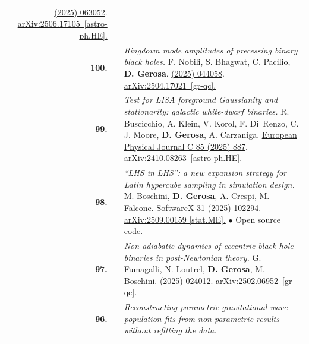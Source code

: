 {\begin{longtable}{rp{0.3cm}p{15.8cm}}
\newline{}
\href{https://journals.aps.org/prd/abstract/10.1103/jj7m-x66y}{\prd 112 (2025) 063052}. \href{https://arxiv.org/abs/2506.17105}{arXiv:2506.17105 [astro-ph.HE].}
\vspace{0.09cm}\\
%
\textbf{100.} & & \textit{Ringdown mode amplitudes of precessing binary black holes.}
\newline{}
F. Nobili, S. Bhagwat, C. Pacilio, \textbf{D. Gerosa}.
\newline{}
\href{https://journals.aps.org/prd/abstract/10.1103/cl3k-3xt2}{\prd 112 (2025) 044058}. \href{https://arxiv.org/abs/2504.17021}{arXiv:2504.17021 [gr-qc].}
\vspace{0.09cm}\\
%
\textbf{99.} & & \textit{Test for LISA foreground Gaussianity and stationarity: galactic white-dwarf binaries.}
\newline{}
R. Buscicchio, A. Klein, V. Korol, F. Di Renzo, C. J. Moore, \textbf{D. Gerosa}, A. Carzaniga.
\newline{}
\href{https://doi.org/10.1140/epjc/s10052-025-14616-w}{European Physical Journal C 85 (2025) 887}. \href{https://arxiv.org/abs/2410.08263}{arXiv:2410.08263 [astro-ph.HE].}
\vspace{0.09cm}\\
%
\textbf{98.} & & \textit{“LHS in LHS”: a new expansion strategy for Latin hypercube sampling in simulation design.}
\newline{}
M. Boschini, \textbf{D. Gerosa}, A. Crespi, M. Falcone.
\newline{}
\href{https://authors.elsevier.com/sd/article/S2352-7110(25)00260-2}{SoftwareX 31 (2025) 102294}. \href{https://arxiv.org/abs/2509.00159}{arXiv:2509.00159 [stat.ME].}
\newline{}
\textcolor{color1}{$\bullet$} Open source code.
\vspace{0.09cm}\\
%
\textbf{97.} & & \textit{Non-adiabatic dynamics of eccentric black-hole binaries in post-Newtonian theory.}
\newline{}
G. Fumagalli, N. Loutrel, \textbf{D. Gerosa}, M. Boschini.
\newline{}
\href{https://journals.aps.org/prd/abstract/10.1103/znmj-6wvt}{\prd 112 (2025) 024012}. \href{https://arxiv.org/abs/2502.06952}{arXiv:2502.06952 [gr-qc].}
\vspace{0.09cm}\\
%
\textbf{96.} & & \textit{Reconstructing parametric gravitational-wave population fits from non-parametric results without refitting the data.}

\end{longtable}}
